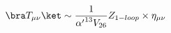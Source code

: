 \begin{equation}
  \bra T_{\mu\nu}\ket \sim \frac{1}{{\alpha'}^{13}V_{26}} Z_{1-loop} \times
  \eta_{\mu\nu}
\end{equation}

